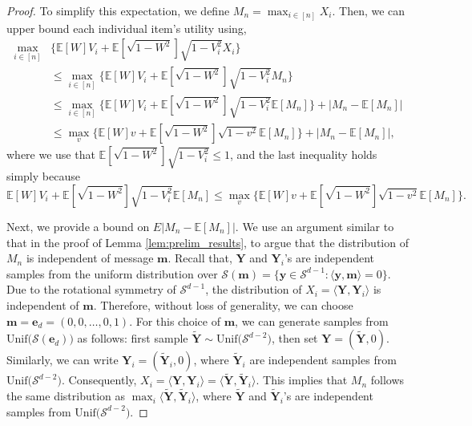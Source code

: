 \documentclass[12pt]{article}
\theoremstyle{definition}
\theoremstyle{remark}
\begin{document}
\begin{proof}
To simplify this expectation, we define $M_n = \max_{i \in [n]} X_i$. Then, we can upper bound each individual item's utility using,
\begin{align}
\label{eq:replace_Mn_expec}
\max_{i \in [n]} & \big\{ \mathbb{E}[W] V_i + \mathbb{E}[\sqrt{1-W^2}] \sqrt{1-V_i^2} X_i \big\} \nonumber\\
&\leq \max_{i \in [n]} \big\{ \mathbb{E}[W] V_i + \mathbb{E}[\sqrt{1-W^2}] \sqrt{1-V_i^2} M_n \big\} \nonumber\\
& \leq \max_{i \in [n]} \big\{ \mathbb{E}[W] V_i + \mathbb{E}[\sqrt{1-W^2}] \sqrt{1-V_i^2} \mathbb E [M_n] \big\} + |M_n -\mathbb E [M_n]| \nonumber\\
&\leq \max_v \Big\{\mathbb{E}[W] v + \mathbb{E}[\sqrt{1-W^2}] \sqrt{1-v^2} \mathbb E [M_n] \Big\} + |M_n -\mathbb E [M_n]|,
\end{align}
where we use that $\mathbb{E}[\sqrt{1-W^2}] \sqrt{1-V_i^2}\leq 1$, and the last inequality holds simply because
\begin{equation*}
    \mathbb{E}[W] V_i + \mathbb{E}[\sqrt{1-W^2}] \sqrt{1-V_i^2} \mathbb E [M_n] \leq \max_v \Big\{\mathbb{E}[W] v + \mathbb{E}[\sqrt{1-W^2}] \sqrt{1-v^2} \mathbb E [M_n] \Big\}.
\end{equation*}

Next, we provide a bound on $E|M_n -\mathbb E [M_n]|$. We use an argument similar to that in the proof of Lemma \ref{lem:prelim_results}, to argue that the distribution of $M_n$ is independent of message $\mathbf{m}$. Recall that, $\mathbf{Y}$ and ${\mathbf{Y}_i}$'s are independent samples from the uniform distribution over $\mathcal{S}(\mathbf{m}) = \{ \mathbf{y} \in \mathcal{S}^{d-1} : \langle \mathbf{y}, \mathbf{m} \rangle = 0 \}$. Due to the rotational symmetry of $\mathcal{S}^{d-1}$, the distribution of $X_i = \langle \mathbf{Y} , \mathbf{Y}_i \rangle$ is independent of $\mathbf{m}$. Therefore, without loss of generality, we can choose $\mathbf{m} = \mathbf{e}_d = (0, 0, \dots, 0, 1)$. For this choice of $\mathbf{m}$, we can generate samples from $\text{Unif}\big(\mathcal{S}(\mathbf{e}_d)\big)$ as follows: first sample $\tilde{\mathbf{Y}} \sim \text{Unif}\big(\mathcal{S}^{d-2}\big)$, then set $\mathbf{Y} = (\tilde{\mathbf{Y}}, 0)$. Similarly, we can write $\mathbf{Y}_i = (\tilde{\mathbf{Y}}_i, 0)$, where $\tilde{\mathbf{Y}}_i$ are independent samples from $\text{Unif}\big(\mathcal{S}^{d-2}\big)$. Consequently, $X_i = \langle \mathbf{Y}, \mathbf{Y}_i \rangle = \langle \tilde{\mathbf{Y}}, \tilde{\mathbf{Y}}_i \rangle$. This implies that $M_n$ follows the same distribution as $ \max_i \langle \tilde{\mathbf{Y}}, \tilde{\mathbf{Y}}_i \rangle$, where $\tilde{\mathbf{Y}}$ and $\tilde{\mathbf{Y}}_i$'s are independent samples from $\text{Unif}\big(\mathcal{S}^{d-2}\big)$.


\end{proof}
\end{document}

